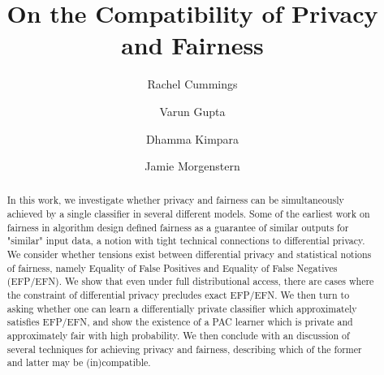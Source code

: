 \documentclass[format = sigconf]{acmart}
\newcommand{\1}{\mathbbm{1}}
\theoremstyle{definition}
\begin{document}
\title{On the Compatibility of Privacy and Fairness}
\author{Rachel Cummings\footnotemark[1] \and Varun Gupta\footnotemark[1] \and Dhamma Kimpara\footnotemark[1] \and Jamie Morgenstern\footnotemark[1]}

\begin{abstract}
  In this work, we investigate whether privacy and fairness can be
  simultaneously achieved by a single classifier in several different
  models. Some of the earliest work on fairness in algorithm design
  defined fairness as a guarantee of similar outputs for "similar"
  input data, a notion with tight technical connections to
  differential privacy. We consider whether tensions exist between
  differential privacy and statistical notions of fairness, namely
  Equality of False Positives and Equality of False Negatives
  (EFP/EFN). We show that even under full distributional access, there
  are cases where the constraint of differential privacy precludes
  exact EFP/EFN. We then turn to asking whether one can learn a
  differentially private classifier which approximately satisfies
  EFP/EFN, and show the existence of a PAC learner which is private
  and approximately fair with high probability. We then conclude with
  an discussion of several techniques for achieving privacy and
  fairness, describing which of the former and latter may be
  (in)compatible.
\end{abstract}

\maketitle

\renewcommand{\thefootnote}{\fnsymbol{footnote}}

\renewcommand{\thefootnote}{\arabic{footnote}}





\end{document}
